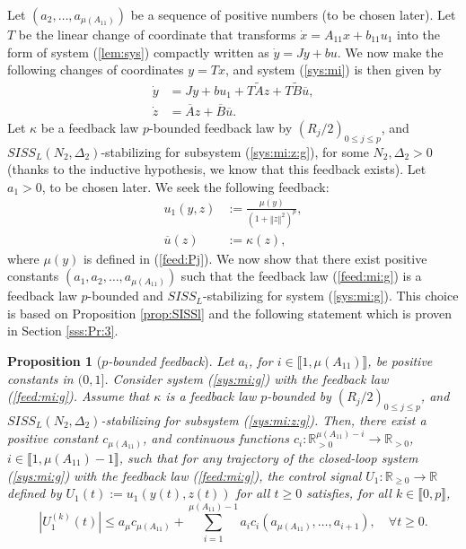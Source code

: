\documentclass[letterpaper, 10pt]{article}
\newtheorem{propo}{Proposition}
\newcommand{\rref}[1]{(\ref{#1})}
\newcommand{\norme}[1]{\left\Vert #1\right\Vert}
\newcommand{\abs}[1]{\left| #1 \right|}
\newcommand{\reels}{\mathbb{R}}
\begin{document}
Let $(a_2, \ldots , a_{\mu(A_{11})})$ be a sequence of positive numbers (to be chosen later). Let $T$ be the linear change of coordinate that transforms $\dot{x}  = A_{11} x + b_{11} u_1$ into the form of system \rref{lem:sys} compactly written as $\dot{y}=J y + b u$. We now make the following changes of coordinates $y= Tx$, and system \rref{sys:mi} is then given by
\begin{subequations}
\label{sys:mi:g}
\begin{align}
\dot{y}&  = J y +b  u_1 + T \tilde{A}z+ T \tilde{B}\overline{u}, \label{sys:mi:x:g} \\
\dot{z} & =  \overline{A} z + \overline{B} \overline{u}. \label{sys:mi:z:g}
\end{align}
\end{subequations}
Let $\kappa$ be a feedback law $p$-bounded feedback law by $(R_j/2)_{0 \leq j \leq p}$, and $SISS_L(N_2, \Delta_2)$-stabilizing for subsystem \rref{sys:mi:z:g}, for some $N_2, \Delta_2 >0$ (thanks to the inductive hypothesis, we know that this feedback exists). Let $a_1>0$, to be chosen later.  We seek the following feedback:
\begin{subequations}
\label{feed:mi:g}
\begin{align}
\label{feed:mi_1}
u_1(y,z)& :=\frac{\mu(y)}{(1+\norme{z}^2)^{p}}, \\ \label{feed:mi_2}
\overline{u}(z) & := \kappa(z), 
\end{align}
\end{subequations} where $\mu(y)$ is defined in \rref{feed:Pj}. We now show that there exist positive constants $(a_1,a_2, \ldots , a_{\mu(A_{11})})$  such that the feedback law \rref{feed:mi:g} is a feedback law $p$-bounded and $SISS_L$-stabilizing for system \rref{sys:mi:g}. This choice is based on Proposition \ref{prop:SISSl} and the following statement which is proven in Section \ref{sss:Pr:3}.
\begin{propo}[\emph{$p$-bounded feedback}]
\label{prop:bound:U:mi}
Let $a_i$, for $i \in \llbracket 1 ,\mu(A_{11}) \rrbracket $, be positive constants in $(0,1]$. Consider system \rref{sys:mi:g} with the feedback law \rref{feed:mi:g}. Assume that $\kappa$ is a feedback law $p$-bounded by $(R_j/2)_{0 \leq j \leq p}$, and $SISS_L(N_2, \Delta_2)$-stabilizing for subsystem \rref{sys:mi:z:g}. 
Then, there exist a positive constant $c_{\mu(A_{11})}$, and continuous functions $c_i : \reels^{\mu(A_{11}) -i}_{>0 } \to \reels_{>0} $, $i \in \llbracket 1 , \mu(A_{11}) -1 \rrbracket$, such that for any trajectory of the closed-loop system \rref{sys:mi:g} with the feedback law \rref{feed:mi:g}, the control signal $U_1 : \reels_{\geq 0} \rightarrow  \reels $ defined by $U_1(t) := u_1 (y(t),z(t)) $ for all $t \geq 0$ satisfies, for all $k \in \llbracket 0 ,p \rrbracket $,
\begin{equation*}
\abs{ U_1^{(k)}(t)} \leq a_\mu c_{\mu(A_{11})}+ \sum\limits_{i=1}^{ \mu(A_{11}) - 1 } a_i c_i( a_{\mu(A_{11})} , \ldots , a_{i+1} ), \quad \forall t \geq 0. 
\end{equation*}
\end{propo}
\end{document}
